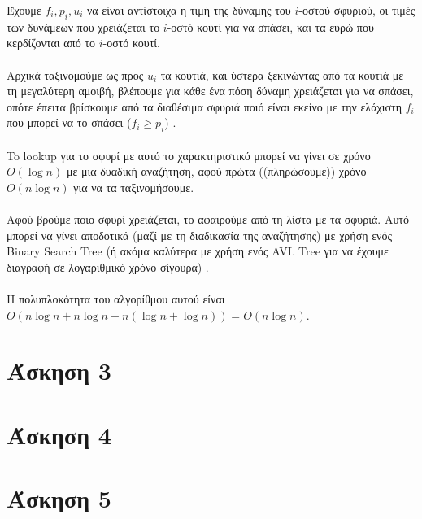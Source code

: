 \documentclass[12pt,a4paper]{article}
\begin{document}
    Έχουμε \( f_i, p_i, u_i \) να είναι αντίστοιχα η τιμή της δύναμης του \( i 
    \)-οστού σφυριού, οι τιμές των δυνάμεων που χρειάζεται το \( i \)-οστό κουτί
    για να σπάσει, και τα ευρώ που κερδίζονται από το \( i \)-οστό κουτί.\\
    \\
    Αρχικά ταξινομούμε ως προς \( u_i \) τα κουτιά, και ύστερα ξεκινώντας από τα
    κουτιά με τη μεγαλύτερη αμοιβή, βλέπουμε για κάθε ένα πόση δύναμη χρειάζεται
    για να σπάσει, οπότε έπειτα βρίσκουμε από τα διαθέσιμα σφυριά ποιό είναι
    εκείνο με την ελάχιστη \( f_i \) που μπορεί να το σπάσει (\( f_i \ge p_i \))
    .\\
    \\
    To {\latintext lookup} για το σφυρί με αυτό το χαρακτηριστικό μπορεί να
    γίνει σε χρόνο \( Ο(\log{n}) \) με μια δυαδική αναζήτηση, αφού πρώτα
    ((πληρώσουμε)) χρόνο \( Ο(n\log{n}) \) για να τα ταξινομήσουμε.\\
    \\
    Αφού βρούμε ποιο σφυρί χρειάζεται, το αφαιρούμε από τη λίστα με τα σφυριά.
    Αυτό μπορεί να γίνει αποδοτικά (μαζί με τη διαδικασία της αναζήτησης) με
    χρήση ενός {\latintext Binary Search Tree} (ή ακόμα καλύτερα με χρήση ενός
    {\latintext AVL Tree} για να έχουμε διαγραφή σε λογαριθμικό χρόνο σίγουρα)
    .\\
    \\
    Η πολυπλοκότητα του αλγορίθμου αυτού είναι \( O(n\log{n} + n\log{n} +
    n(\log{n} + \log{n})) = O(n\log{n}) \).

  \section{Άσκηση 3}
  
  \section{Άσκηση 4}
  
  \section{Άσκηση 5}
\end{document}
